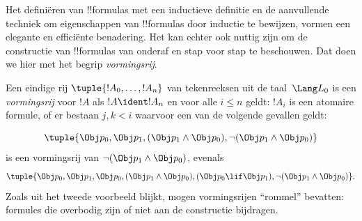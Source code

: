 \documentclass[openany]{memoir}
\begin{document}
\begingroup
\def\olfilename{OLP-0060}
\def\olfilepath{content/propositional-logic/syntax-and-semantics/}
\hypertarget{unit-OLP-0060}{}





Het definiëren van !!{formula}s met een inductieve definitie en de
aanvullende techniek om eigenschappen van !!{formula}s door inductie te
bewijzen, vormen een elegante en efficiënte benadering. Het kan echter
ook nuttig zijn om de constructie van !!{formula}s van onderaf en stap
voor stap te beschouwen. Dat doen we hier met het begrip
\emph{vormingsrij}.

\begin{defn}
Een eindige rij $\tuple{!A_0,\dotsc,!A_n}$ van tekenreeksen uit de
taal~$\Lang L_0$ is een \emph{vormingsrij} voor $!A$ als
$!A \ident !A_n$ en voor alle $i \leq n$ geldt: $!A_i$ is een
atomaire formule, of er bestaan $j,k < i$ waarvoor een van de volgende
gevallen geldt:
\begin{enumerate}
\end{enumerate}
\end{defn}

\begin{ex}
\[
\tuple{
    \Obj p_0,
    \Obj p_1,
    (\Obj p_1 \land \Obj p_0),
    \lnot (\Obj p_1 \land \Obj p_0)
}
\]
is een vormingsrij van
$\lnot (\Obj p_1 \land \Obj p_0)$, evenals
\[
\tuple{
    \Obj p_0,
    \Obj p_1,
    \Obj p_0,
    (\Obj p_1 \land \Obj p_0),
    (\Obj p_0 \lif \Obj p_1),
    \lnot (\Obj p_1 \land \Obj p_0)
}.
\]
%
Zoals uit het tweede voorbeeld blijkt, mogen vormingsrijen ``rommel''
bevatten: formules die overbodig zijn of niet aan de constructie
bijdragen.
\end{ex}
\end{document}
